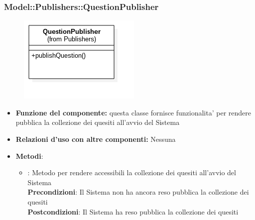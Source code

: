 \subsubsection{Model::Publishers::QuestionPublisher}
\begin{figure}[h!]
\begin{center}
	\includegraphics[scale=0.4]{../images/Model/Publishers/QuestionPublisher.png}
\end{center}
\end{figure}
\begin{itemize}
\item\textbf{Funzione del componente:} questa classe fornisce funzionalita' per rendere pubblica la collezione dei quesiti all'avvio del Sistema
\item\textbf{Relazioni d'uso con altre componenti:} Nessuna \\
\item\textbf{Metodi}:
	\begin{itemize}
		\item{} : Metodo per rendere accessibili la collezione dei quesiti all'avvio del Sistema\\
		\textbf{Precondizioni}: Il Sistema non ha ancora reso pubblica la collezione dei quesiti\\
		\textbf{Postcondizioni}: Il Sistema ha reso pubblica la collezione dei quesiti\\
	\end{itemize}
\end{itemize}